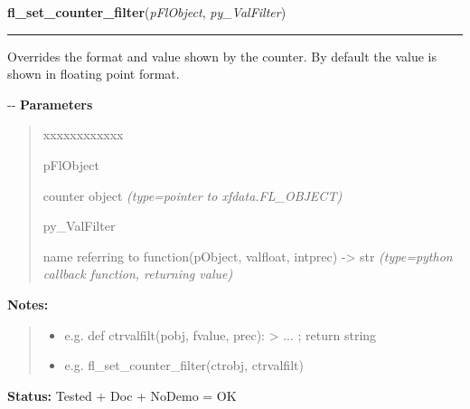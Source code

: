 \hspace{.8\funcindent}\begin{boxedminipage}{\funcwidth}

    \raggedright \textbf{fl\_set\_counter\_filter}(\textit{pFlObject}, \textit{py\_ValFilter})

    \vspace{-1.5ex}

    \rule{\textwidth}{0.5\fboxrule}
\setlength{\parskip}{2ex}

Overrides the format and value shown by the counter. By default the
value is shown in floating point format.

-{}-
\setlength{\parskip}{1ex}
      \textbf{Parameters}
      \vspace{-1ex}

      \begin{quote}
        \begin{Ventry}{xxxxxxxxxxxx}

          \item[pFlObject]


counter object
            {\it (type=pointer to xfdata.FL\_OBJECT)}

          \item[py\_ValFilter]


name referring to function(pObject, valfloat, intprec) -> str
            {\it (type=python callback function, returning value)}

        \end{Ventry}

      \end{quote}

\textbf{Notes:}
\begin{quote}
  \begin{itemize}

  \item
    \setlength{\parskip}{0.6ex}

e.g. def ctrvalfilt(pobj, fvalue, prec): > ... ; return string


  \item 
e.g. fl\_set\_counter\_filter(ctrobj, ctrvalfilt)


\end{itemize}

\end{quote}

\textbf{Status:} 
Tested + Doc + NoDemo = OK


    \end{boxedminipage}

